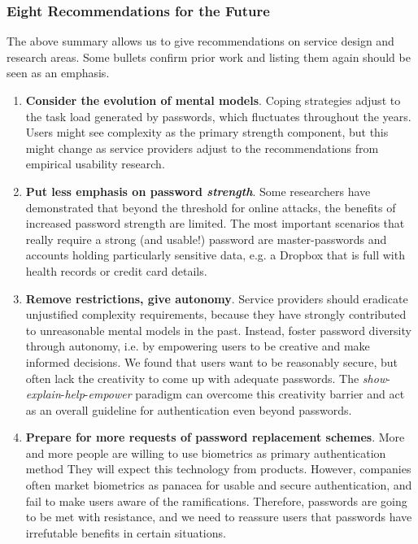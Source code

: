 \subsubsection{Eight Recommendations for the Future}\label{sec:summary:recommendations}
The above summary allows us to give recommendations on service design and research areas. Some bullets confirm prior work and listing them again should be seen as an emphasis. 
\begin{enumerate}
	\item \textbf{Consider the evolution of mental models}. Coping strategies adjust to the task load generated by passwords, which fluctuates throughout the years. Users might see complexity as the primary strength component, but this might change as service providers adjust to the recommendations from empirical usability research. 
	
	\item \textbf{Put less emphasis on password \textit{strength}}. Some researchers have demonstrated that beyond the threshold for online attacks, the benefits of increased password strength are limited. The most important scenarios that really require a strong (and usable!) password are master-passwords and accounts holding particularly sensitive data, e.g. a Dropbox that is full with health records or credit card details. 
	
	\item \textbf{Remove restrictions, give autonomy}. Service providers should eradicate unjustified complexity requirements, because they have strongly contributed to unreasonable mental models in the past. Instead, foster password diversity through autonomy, i.e. by empowering users to be creative and make informed decisions. We found that users want to be reasonably secure, but often lack the creativity to come up with adequate passwords.
	The \textit{show}-\textit{explain}-\textit{help}-\textit{empower} paradigm can overcome this creativity barrier and act as an overall guideline for authentication even beyond passwords.
	
	\item \textbf{Prepare for more requests of password replacement schemes}. More and more people are willing to use biometrics as primary authentication method%
	They will expect this technology from products. However, companies often market biometrics as panacea for usable and secure authentication, and fail to make users aware of the ramifications. Therefore, passwords are going to be met with resistance, and we need to reassure users that passwords have irrefutable benefits in certain situations. 
		

\end{enumerate}
